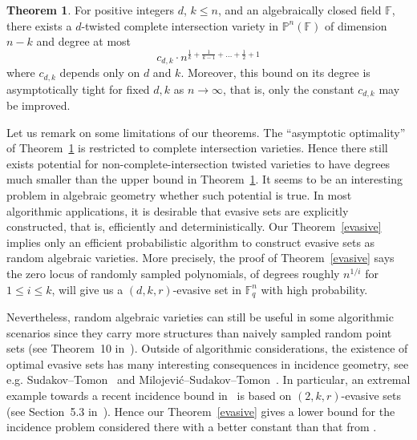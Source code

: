 \documentclass[11pt]{article}
\theoremstyle{definition}
\newtheorem{theorem}{Theorem}[section]
\begin{document}
\begin{theorem}\label{twisted}
    For positive integers $d$, $k \leq n$, and an algebraically closed field $\mathbb{F}$, there exists a $d$-twisted complete intersection variety in $\mathbb{P}^n(\mathbb{F})$ of dimension $n-k$ and degree at most \begin{equation*}
        c_{d,k} \cdot n^{\frac{1}{k} + \frac{1}{k-1} + \dots + \frac{1}{2} + 1}
    \end{equation*} where $c_{d,k}$ depends only on $d$ and $k$. Moreover, this bound on its degree is asymptotically tight for fixed $d,k$ as $n \to \infty$, that is, only the constant $c_{d,k}$ may be improved.
\end{theorem}

Let us remark on some limitations of our theorems. The ``asymptotic optimality'' of Theorem~\ref{twisted} is restricted to complete intersection varieties. Hence there still exists potential for non-complete-intersection twisted varieties to have degrees much smaller than the upper bound in Theorem~\ref{twisted}. It seems to be an interesting problem in algebraic geometry whether such potential is true. In most algorithmic applications, it is desirable that evasive sets are explicitly constructed, that is, efficiently and deterministically. Our Theorem~\ref{evasive} implies only an efficient probabilistic algorithm to construct evasive sets as random algebraic varieties. More precisely, the proof of Theorem~\ref{evasive} says the zero locus of randomly sampled polynomials, of degrees roughly $n^{1/i}$ for $1\leq i\leq k$, will give us a $(d,k,r)$-evasive set in $\mathbb{F}_q^n$ with high probability.

Nevertheless, random algebraic varieties can still be useful in some algorithmic scenarios since they carry more structures than naively sampled random point sets (see Theorem~10 in~\cite{guruswami2011linear}). Outside of algorithmic considerations, the existence of optimal evasive sets has many interesting consequences in incidence geometry, see e.g. Sudakov--Tomon~\cite{sudakov2024evasive} and Milojevi\'c--Sudakov--Tomon~\cite{milojevic2024incidence}. In particular, an extremal example towards a recent incidence bound in~\cite{milojevic2024incidence} is based on $(2,k,r)$-evasive sets (see Section~5.3 in~\cite{milojevic2024incidence}). Hence our Theorem~\ref{evasive} gives a lower bound for the incidence problem considered there with a better constant than that from \cite{dvir2014variety}.

\medskip
\end{document}
